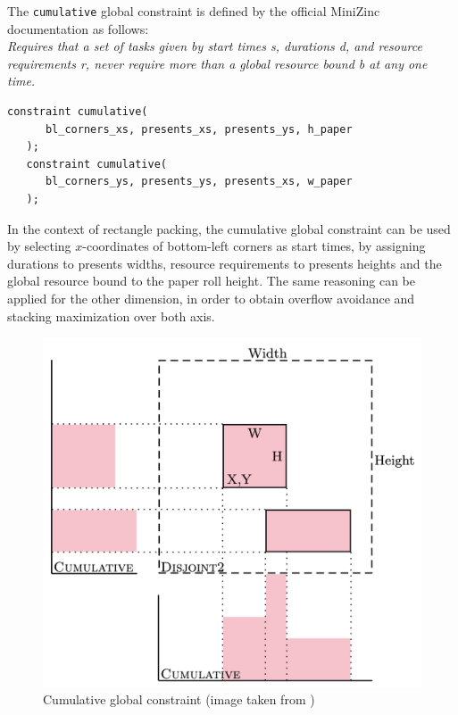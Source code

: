 \documentclass[a4paper,10pt]{article}
\newcounter{subsubsubsection}[subsubsection]
\begin{document}
 \label{sec:cumulative}
The \texttt{cumulative} global constraint is defined by the official MiniZinc documentation \cite{minizinc} as follows: \\
\emph{Requires that a set of tasks given by start times s, durations d, and resource requirements r, never require more than a global resource bound b at any one time.}

\begin{Verbatim}[samepage=true]
   constraint cumulative(
      bl_corners_xs, presents_xs, presents_ys, h_paper
   );
   constraint cumulative(
      bl_corners_ys, presents_ys, presents_xs, w_paper
   );
\end{Verbatim}

In the context of rectangle packing, the cumulative global constraint can be used by selecting $x$-coordinates of bottom-left corners as start times, by assigning durations to presents widths, resource requirements to presents heights and the global resource bound to the paper roll height.
The same reasoning can be applied for the other dimension, in order to obtain overflow avoidance and stacking maximization over both axis.

\begin{figure}[H]
   \centering
   \includegraphics[scale=0.2]{cumulative.png}
   \caption{Cumulative global constraint (image taken from \cite{cumulative})}
   \label{fig:cumulative}
\end{figure}
\end{document}
